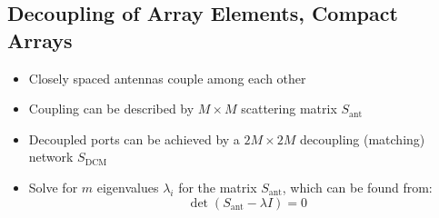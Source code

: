 \subsection{Decoupling of Array Elements, Compact Arrays}
\begin{itemize}
    \itemsep0pt
    \item Closely spaced antennas couple among each other
    \item Coupling can be described by $M\times M$ scattering matrix $S_{\mathrm{ant}}$
    \item Decoupled ports can be achieved by a $2M\times 2M$ decoupling (matching) network $S_{\mathrm{DCM}}$
    \item Solve for $m$ eigenvalues $\lambda_i$ for the matrix $S_{\mathrm{ant}}$, which can be found from:
        \begin{equation*}
            \det(S_{\mathrm{ant}} - \lambda I) = 0
        \end{equation*}
\end{itemize}
